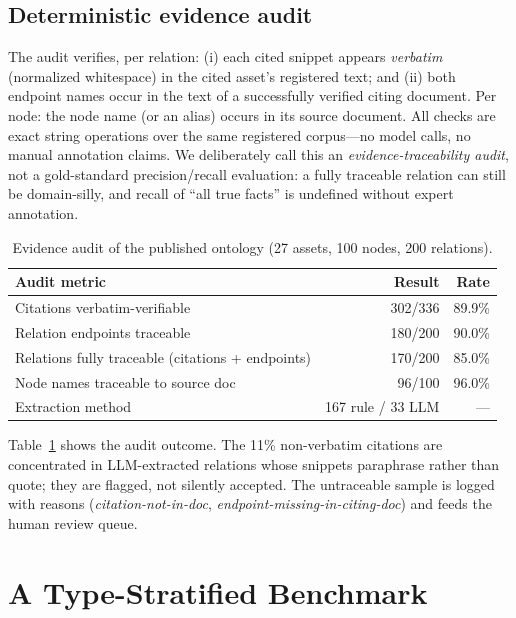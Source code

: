 \documentclass[runningheads]{llncs}
\begin{document}
\subsection{Deterministic evidence audit}
\label{sec:audit-method}
The audit verifies, per relation: (i) each cited snippet appears \emph{verbatim}
(normalized whitespace) in the cited asset's registered text; and (ii) both
endpoint names occur in the text of a successfully verified citing document.
Per node: the node name (or an alias) occurs in its source document. All checks
are exact string operations over the same registered corpus---no model calls,
no manual annotation claims. We deliberately call this an
\emph{evidence-traceability audit}, not a gold-standard precision/recall
evaluation: a fully traceable relation can still be domain-silly, and recall
of ``all true facts'' is undefined without expert annotation.

\begin{table}[t]
\caption{Evidence audit of the published ontology (27 assets, 100 nodes,
200 relations).}
\label{tab:audit}
\centering
\small
\begin{tabular}{lrr}
\toprule
Audit metric & Result & Rate \\
\midrule
Citations verbatim-verifiable & 302/336 & 89.9\% \\
Relation endpoints traceable & 180/200 & 90.0\% \\
Relations fully traceable (citations + endpoints) & 170/200 & 85.0\% \\
Node names traceable to source doc & 96/100 & 96.0\% \\
\midrule
Extraction method & 167 rule / 33 LLM & --- \\
\bottomrule
\end{tabular}
\end{table}

Table~\ref{tab:audit} shows the audit outcome. The 11\% non-verbatim
citations are concentrated in LLM-extracted relations whose snippets
paraphrase rather than quote; they are flagged, not silently accepted. The
untraceable sample is logged with reasons (\emph{citation-not-in-doc},
\emph{endpoint-missing-in-citing-doc}) and feeds the human review queue.

\section{A Type-Stratified Benchmark}
\label{sec:bench}
\end{document}
